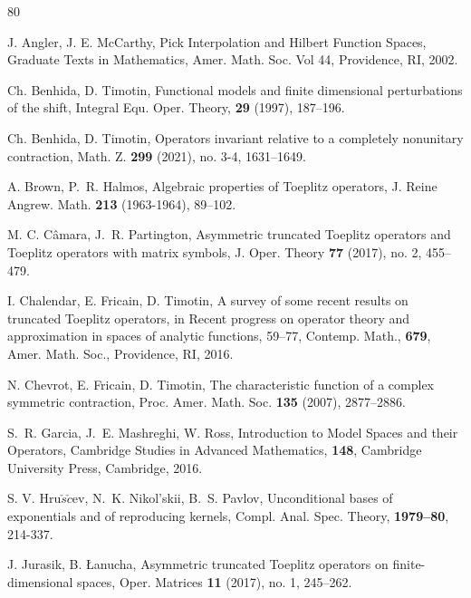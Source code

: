 \documentclass{amsart}
\theoremstyle{definition}
\begin{document}
\begin{thebibliography}{80}

  J. Angler, J. E. McCarthy, Pick Interpolation and Hilbert Function Spaces, Graduate Texts in Mathematics, Amer. Math. Soc. Vol 44, Providence, RI, 2002.

 Ch. Benhida, D. Timotin, Functional models and finite dimensional perturbations of the shift, Integral Equ. Oper. Theory, {\bf 29} (1997), 187--196.

 Ch. Benhida, D. Timotin, Operators invariant relative to a completely nonunitary contraction, Math. Z.
{\bf 299} (2021), no. 3-4, 1631--1649. 

 A. Brown, P.~R. Halmos, Algebraic properties of Toeplitz operators, J. Reine Angrew. Math.  {\bf 213} (1963-1964), 89--102.


M. C. C\^{a}mara, J.~R. Partington, Asymmetric truncated Toeplitz operators and Toeplitz operators with matrix symbols, J. Oper. Theory \textbf{77} (2017), no. 2, 455--479.

I. Chalendar, E. Fricain, D. Timotin, A survey of some recent results on truncated Toeplitz operators, in Recent progress on operator theory and approximation in spaces of analytic functions, 59--77, Contemp. Math., {\bf 679}, Amer. Math. Soc., Providence, RI, 2016.

 N. Chevrot, E. Fricain, D. Timotin, The characteristic function of a complex symmetric contraction,  Proc. Amer. Math. Soc. {\bf 135} (2007),  2877--2886.

{S.~R. Garcia, J.~E. Mashreghi, W. Ross}, Introduction to Model Spaces and their Operators, Cambridge Studies in Advanced Mathematics, \textbf{148}, Cambridge University Press, Cambridge, 2016.

{S. V. Hru$\check{s}\check{c}$ev, N.~K. Nikol'skii, B.~S. Pavlov}, Unconditional bases of exponentials and of reproducing kernels, Compl. Anal. Spec. Theory, \textbf{1979--80}, 214-337.

J. Jurasik, B. \L anucha, Asymmetric truncated Toeplitz operators on finite-dimensional spaces, Oper. Matrices \textbf{11} (2017), no. 1, 245--262.


\end{thebibliography}
\end{document}
